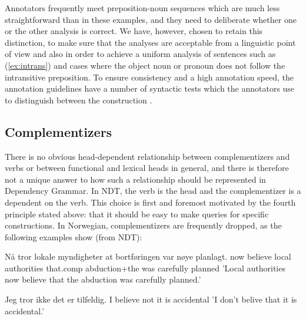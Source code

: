 \documentclass[11pt,a4paper]{article}
\begin{document}
Annotators frequently meet preposition-noun sequences which are much less straightforward than in these examples, and they need to deliberate whether one or the other analysis is correct. We have, however, chosen to retain this distinction, to make sure that the analyses are acceptable from a linguistic point of view and also in order to achieve a uniform analysis of sentences such as (\ref{ex:intrans}) and cases where the object noun or pronoun does not follow the intransitive preposition. To ensure consistency and a high annotation speed, the annotation guidelines have a number of syntactic tests which the annotators use to distinguish between the construction \cite[54-56]{Kin:Sol:Eri:2013}.

\subsection{Complementizers}
There is no obvious head-dependent relationship between complementizers and verbs or between functional and lexical heads in general, and there is therefore not a unique answer to how such a relationship should be represented in Dependency Grammar.
In NDT, the verb is the head and the complementizer is a dependent on the verb. This choice is first and foremost motivated by the fourth principle stated above: that it should be easy to make queries for specific constructions. In Norwegian, complementizers are frequently dropped, as the following examples show (from NDT):
\begin{examples}
\item\label{ex:medat}
\gll Nå tror lokale myndigheter at bortføringen var nøye planlagt.
now believe local authorities that.comp abduction+the was carefully planned
\glt 'Local authorities now believe that the abduction was carefully planned.'
\glend

\item\label{ex:utenat}
\gll Jeg tror ikke det er tilfeldig.
I believe not it is accidental
\glt 'I don't belive that it is accidental.'
\glend
\end{examples}
 
\end{document}
